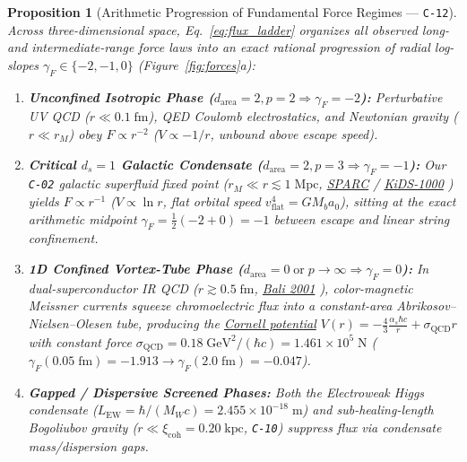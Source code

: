 \documentclass[11pt,letterpaper]{article}
\newtheorem{proposition}[theorem]{Proposition}
\begin{document}
\begin{proposition}[Arithmetic Progression of Fundamental Force Regimes --- \texttt{C-12}]
Across three-dimensional space, Eq.~\eqref{eq:flux_ladder} organizes all observed long- and intermediate-range force laws into an exact rational progression of radial log-slopes $\gamma_F \in \{-2, -1, 0\}$ (Figure~\ref{fig:forces}a):
\begin{enumerate}
  \setlength{\itemsep}{2pt}\setlength{\parskip}{0pt}
  \item \textbf{Unconfined Isotropic Phase ($d_{\mathrm{area}} = 2, p = 2 \Rightarrow \gamma_F = -2$):} Perturbative UV QCD ($r \ll 0.1\;\mathrm{fm}$), QED Coulomb electrostatics, and Newtonian gravity ($r \ll r_M$) obey $F \propto r^{-2}$ ($V \propto -1/r$, unbound above escape speed).
  \item \textbf{Critical $d_s = 1$ Galactic Condensate ($d_{\mathrm{area}} = 2, p = 3 \Rightarrow \gamma_F = -1$):} Our \texttt{C-02} galactic superfluid fixed point ($r_M \ll r \lesssim 1\;\mathrm{Mpc}$, \href{https://astroweb.cwru.edu/SPARC/RARbins.mrt}{SPARC} / \href{https://arxiv.org/abs/2406.09685}{KiDS-1000} \cite{Mistele2024}) yields $F \propto r^{-1}$ ($V \propto \ln r$, flat orbital speed $v_{\mathrm{flat}}^4 = G M_b a_0$), sitting at the \emph{exact arithmetic midpoint} $\gamma_F = \frac{1}{2}(-2 + 0) = -1$ between escape and linear string confinement.
  \item \textbf{1D Confined Vortex-Tube Phase ($d_{\mathrm{area}} = 0 \;\text{or}\; p \to \infty \Rightarrow \gamma_F = 0$):} In dual-superconductor IR QCD ($r \gtrsim 0.5\;\mathrm{fm}$, \href{https://arxiv.org/pdf/hep-ph/0001312}{Bali 2001} \cite{Bali2001}), color-magnetic Meissner currents squeeze chromoelectric flux into a constant-area Abrikosov--Nielsen--Olesen tube, producing the \href{https://arxiv.org/pdf/hep-ph/0001312}{Cornell potential} $V(r) = -\frac{4}{3}\frac{\alpha_s \hbar c}{r} + \sigma_{\mathrm{QCD}} r$ with constant force $\sigma_{\mathrm{QCD}} = 0.18\;\mathrm{GeV}^2 / (\hbar c) = 1.461\times 10^5\;\mathrm{N}$ ($\gamma_F(0.05\;\mathrm{fm}) = -1.913 \to \gamma_F(2.0\;\mathrm{fm}) = -0.047$).
  \item \textbf{Gapped / Dispersive Screened Phases:} Both the Electroweak Higgs condensate ($L_{\mathrm{EW}} = \hbar/(M_W c) = 2.455\times 10^{-18}\;\mathrm{m}$) and sub-healing-length Bogoliubov gravity ($r \ll \xi_{\mathrm{coh}} = 0.20\;\mathrm{kpc}$, \texttt{C-10}) suppress flux via condensate mass/dispersion gaps.
\end{enumerate}
\end{proposition}
\end{document}
